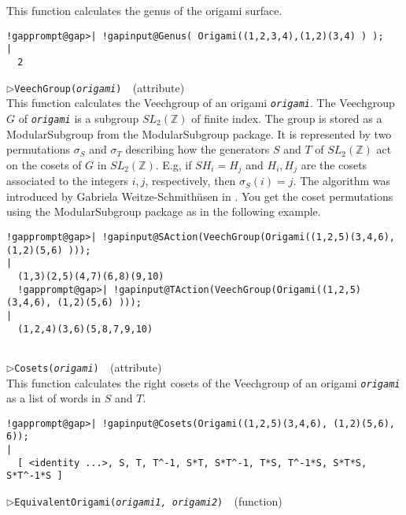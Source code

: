 \documentclass[a4paper,11pt]{report}
\begin{document}
{{{ This function calculates the genus of the origami surface. 
\begin{Verbatim}[commandchars=!@|,fontsize=\small,frame=single,label=Example]
  !gapprompt@gap>| !gapinput@Genus( Origami((1,2,3,4),(1,2)(3,4) ) );
|
  2
\end{Verbatim}
 \noindent\textcolor{FuncColor}{$\triangleright$\enspace\texttt{VeechGroup({\mdseries\slshape origami})
\label{VeechGroup}
}\hfill{\scriptsize (attribute)}}\\


 This function calculates the Veechgroup of an origami \mbox{\texttt{\mdseries\slshape origami}}. The Veechgroup $G$ of \mbox{\texttt{\mdseries\slshape origami}} is a subgroup $SL_2(\mathbb{Z})$ of finite index. The group is stored as a ModularSubgroup from the \textsf{ModularSubgroup} package. It is represented by two permutations $\sigma_S$ and $\sigma_T$ describing how the generators $S$ and $T$ of $SL_2(\mathbb{Z})$ act on the cosets of $G$ in $SL_2(\mathbb{Z})$. E.g, if $SH_i = H_j$ and $H_i,H_j$ are the cosets associated to the integers $i,j$, respectively, then $\sigma_S(i)=j$. The algorithm was introduced by Gabriela Weitze-Schmith{\"u}sen in \cite{MR2118271}. You get the coset permutations using the \textsf{ModularSubgroup} package as in the following example. 
\begin{Verbatim}[commandchars=!@|,fontsize=\small,frame=single,label=Example]
  !gapprompt@gap>| !gapinput@SAction(VeechGroup(Origami((1,2,5)(3,4,6), (1,2)(5,6) )));
|
  (1,3)(2,5)(4,7)(6,8)(9,10)
  !gapprompt@gap>| !gapinput@TAction(VeechGroup(Origami((1,2,5)(3,4,6), (1,2)(5,6) )));
|
  (1,2,4)(3,6)(5,8,7,9,10)
          
\end{Verbatim}
 \noindent\textcolor{FuncColor}{$\triangleright$\enspace\texttt{Cosets({\mdseries\slshape origami})
\label{Cosets}
}\hfill{\scriptsize (attribute)}}\\


 This function calculates the right cosets of the Veechgroup of an origami \mbox{\texttt{\mdseries\slshape origami}} as a list of words in $S$ and $T$. 
\begin{Verbatim}[commandchars=!@|,fontsize=\small,frame=single,label=Example]
  !gapprompt@gap>| !gapinput@Cosets(Origami((1,2,5)(3,4,6), (1,2)(5,6), 6));
|
  [ <identity ...>, S, T, T^-1, S*T, S*T^-1, T*S, T^-1*S, S*T*S, S*T^-1*S ]
\end{Verbatim}
 \noindent\textcolor{FuncColor}{$\triangleright$\enspace\texttt{EquivalentOrigami({\mdseries\slshape origami1, origami2})
\label{EquivalentOrigami}
}\hfill{\scriptsize (function)}}\\


}}}
\end{document}
